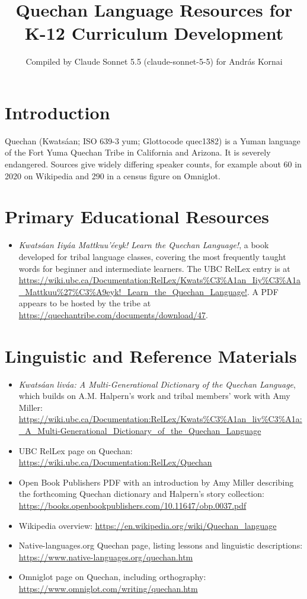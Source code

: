 \documentclass[12pt]{article}
\title{Quechan Language Resources for K-12 Curriculum Development}
\author{Compiled by Claude Sonnet 5.5 (claude-sonnet-5-5) for Andr\'as Kornai}
\date{}
\begin{document}
\maketitle

\section{Introduction}
Quechan (Kwats\'aan; ISO 639-3 yum; Glottocode quec1382) is a Yuman language of the Fort Yuma Quechan Tribe in California and Arizona. It is severely endangered. Sources give widely differing speaker counts, for example about 60 in 2020 on Wikipedia and 290 in a census figure on Omniglot.

\section{Primary Educational Resources}
\begin{itemize}
\item \emph{Kwats\'aan Iiy\'aa Mattkuu'\'eeyk! Learn the Quechan Language!}, a book developed for tribal language classes, covering the most frequently taught words for beginner and intermediate learners. The UBC RelLex entry is at \url{https://wiki.ubc.ca/Documentation:RelLex/Kwats%C3%A1an_Iiy%C3%A1a_Mattkuu%27%C3%A9eyk!_Learn_the_Quechan_Language!}. A PDF appears to be hosted by the tribe at \url{https://quechantribe.com/documents/download/47}.
\end{itemize}

\section{Linguistic and Reference Materials}
\begin{itemize}
\item \emph{Kwats\'aan liv\'aa: A Multi-Generational Dictionary of the Quechan Language}, which builds on A.M. Halpern's work and tribal members' work with Amy Miller: \url{https://wiki.ubc.ca/Documentation:RelLex/Kwats%C3%A1an_liv%C3%A1a:_A_Multi-Generational_Dictionary_of_the_Quechan_Language}
\item UBC RelLex page on Quechan: \url{https://wiki.ubc.ca/Documentation:RelLex/Quechan}
\item Open Book Publishers PDF with an introduction by Amy Miller describing the forthcoming Quechan dictionary and Halpern's story collection: \url{https://books.openbookpublishers.com/10.11647/obp.0037.pdf}
\item Wikipedia overview: \url{https://en.wikipedia.org/wiki/Quechan_language}
\item Native-languages.org Quechan page, listing lessons and linguistic descriptions: \url{https://www.native-languages.org/quechan.htm}
\item Omniglot page on Quechan, including orthography: \url{https://www.omniglot.com/writing/quechan.htm}
\end{itemize}
\end{document}

